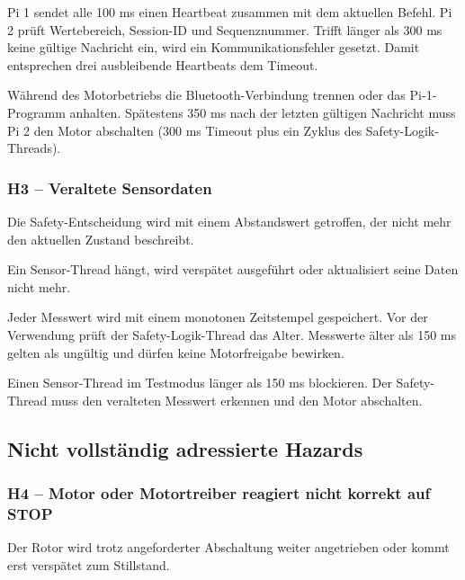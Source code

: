 Pi 1 sendet alle 100 ms einen Heartbeat zusammen mit dem aktuellen Befehl. Pi 2
prüft Wertebereich, Session-ID und Sequenznummer. Trifft länger als 300 ms keine gültige
Nachricht ein, wird ein Kommunikationsfehler gesetzt. Damit entsprechen drei
ausbleibende Heartbeats dem Timeout.


Während des Motorbetriebs die Bluetooth-Verbindung trennen oder das Pi-1-Programm
anhalten. Spätestens 350 ms nach der letzten gültigen Nachricht muss Pi 2 den
Motor abschalten (300 ms Timeout plus ein Zyklus des Safety-Logik-Threads).

\subsubsection{H3 -- Veraltete Sensordaten}
\label{haz:h3}

Die Safety-Entscheidung wird mit einem Abstandswert getroffen, der nicht mehr den
aktuellen Zustand beschreibt.

Ein Sensor-Thread hängt, wird verspätet ausgeführt oder aktualisiert seine Daten
nicht mehr.

Jeder Messwert wird mit einem monotonen Zeitstempel gespeichert. Vor der
Verwendung prüft der Safety-Logik-Thread das Alter. Messwerte älter als 150 ms
gelten als ungültig und dürfen keine Motorfreigabe bewirken.


Einen Sensor-Thread im Testmodus länger als 150 ms blockieren. Der Safety-Thread
muss den veralteten Messwert erkennen und den Motor abschalten.

\subsection{Nicht vollständig adressierte Hazards}

\subsubsection{H4 -- Motor oder Motortreiber reagiert nicht korrekt auf STOP}
\label{haz:h4}

Der Rotor wird trotz angeforderter Abschaltung weiter angetrieben oder kommt erst
verspätet zum Stillstand.

